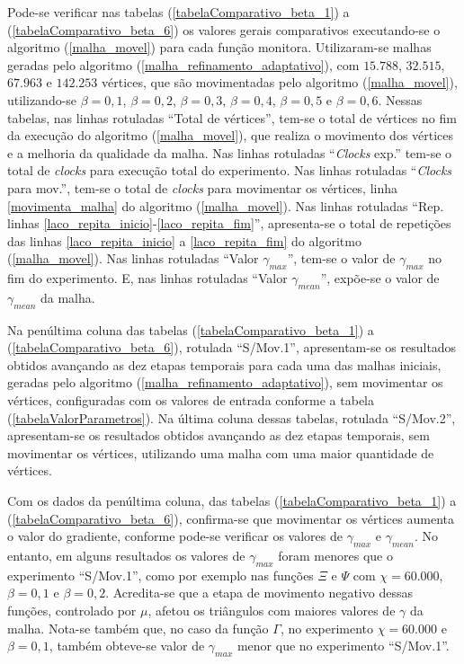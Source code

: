 Pode-se verificar nas tabelas (\ref{tabelaComparativo_beta_1}) a (\ref{tabelaComparativo_beta_6}) os valores gerais comparativos executando-se o algoritmo (\ref{malha_movel}) para cada função monitora. Utilizaram-se malhas geradas pelo algoritmo (\ref{malha_refinamento_adaptativo}), com $15.788$, $32.515$, $67.963$ e $142.253$ vértices, que são movimentadas  pelo algoritmo (\ref{malha_movel}), utilizando-se $\beta = 0,1$, $\beta = 0,2$, $\beta = 0,3$, $\beta = 0,4$, $\beta = 0,5$ e $\beta = 0,6$. Nessas tabelas, nas linhas rotuladas ``Total de vértices'', tem-se o total de vértices no fim da execução do algoritmo (\ref{malha_movel}), que realiza o movimento dos vértices e a melhoria da qualidade da malha. Nas linhas rotuladas ``{\it Clocks} exp.'' tem-se o total de {\it clocks} para execução total do experimento. Nas linhas rotuladas ``{\it Clocks} para mov.'', tem-se o total de {\it clocks} para movimentar os vértices, linha \ref{movimenta_malha} do algoritmo (\ref{malha_movel}). Nas linhas rotuladas ``Rep. linhas \ref{laco_repita_inicio}-\ref{laco_repita_fim}'', apresenta-se o total de repetições das linhas \ref{laco_repita_inicio} a \ref{laco_repita_fim} do algoritmo (\ref{malha_movel}). Nas linhas rotuladas ``Valor $\gamma_{max}$'', tem-se o valor de $\gamma_{max}$ no fim do experimento. E, nas linhas rotuladas ``Valor $\gamma_{mean}$'', expõe-se o valor de $\gamma_{mean}$ da malha.

Na penúltima coluna das tabelas (\ref{tabelaComparativo_beta_1}) a (\ref{tabelaComparativo_beta_6}), rotulada ``S/Mov.1'', apresentam-se os resultados obtidos avançando as dez etapas temporais para cada uma das malhas iniciais, geradas pelo algoritmo (\ref{malha_refinamento_adaptativo}), sem movimentar os vértices, configuradas com os valores de entrada conforme a tabela (\ref{tabelaValorParametros}). Na última coluna dessas tabelas, rotulada ``S/Mov.2'', apresentam-se os resultados obtidos avançando as dez etapas temporais, sem movimentar os vértices, utilizando uma malha com uma maior quantidade de vértices. 

Com os dados da penúltima coluna, das tabelas (\ref{tabelaComparativo_beta_1}) a (\ref{tabelaComparativo_beta_6}), confirma-se que movimentar os vértices aumenta o valor do gradiente, conforme pode-se verificar os valores de $\gamma_{max}$ e $\gamma_{mean}$. No entanto, em alguns resultados os valores de $\gamma_{max}$ foram menores que o experimento ``S/Mov.1'', como por exemplo nas funções $\Xi$ e $\Psi$ com $\chi = 60.000$, $\beta = 0,1$ e $\beta = 0,2$. Acredita-se que a etapa de movimento negativo dessas funções, controlado por $\mu$,  afetou os triângulos com maiores valores de $\gamma$ da malha. Nota-se também que, no caso da função $\Gamma$, no experimento $\chi = 60.000$ e $\beta = 0,1$, também obteve-se valor de $\gamma_{max}$ menor que no experimento ``S/Mov.1''.

